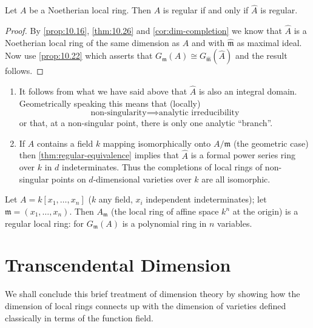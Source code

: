 \begin{proposition}\label{prop:regular-completion}
Let $A$ be a Noetherian local ring. Then $A$ is regular if and only if $\widehat{A}$ is regular.
\end{proposition}

\begin{proof}
By \eqref{prop:10.16}, \eqref{thm:10.26} and \eqref{cor:dim-completion} we know that $\widehat{A}$ is a Noetherian local ring of the same dimension as $A$ and with $\widehat{\mathfrak{m}}$ as maximal ideal. Now use \eqref{prop:10.22} which asserts that $G_{\mathfrak{m}}(A) \cong G_{\widehat{\mathfrak{m}}}(\widehat{A})$ and the result follows.
\end{proof}

\begin{remark}
\begin{enumerate}[1)]
    \item It follows from what we have said above that $\widehat{A}$ is also an integral domain. Geometrically speaking this means that (locally)
    \[
        \text{non-singularity} \implies \text{analytic irreducibility}
    \]
    or that, at a non-singular point, there is only one analytic ``branch''.
    
    \item If $A$ contains a field $k$ mapping isomorphically onto $A/\mathfrak{m}$ (the geometric case) then \eqref{thm:regular-equivalence} implies that $\widehat{A}$ is a formal power series ring over $k$ in $d$ indeterminates. Thus the completions of local rings of non-singular points on $d$-dimensional varieties over $k$ are all isomorphic.
\end{enumerate}
\end{remark}

\begin{example}
Let $A = k[x_1, \ldots, x_n]$ ($k$ any field, $x_i$ independent indeterminates); let $\mathfrak{m} = (x_1, \ldots, x_n)$. Then $A_{\mathfrak{m}}$ (the local ring of affine space $k^n$ at the origin) is a regular local ring: for $G_{\mathfrak{m}}(A)$ is a polynomial ring in $n$ variables.
\end{example}

\section*{Transcendental Dimension}
We shall conclude this brief treatment of dimension theory by showing how the dimension of local rings connects up with the dimension of varieties defined classically in terms of the function field.

